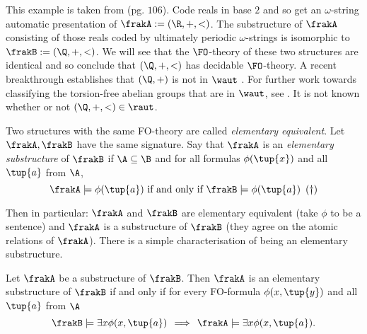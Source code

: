 \begin{example}
This example is taken from \cite{Dauc93} (pg. $106$). Code reals in base $2$ and so get an $\omega$-string automatic presentation of  $\frakA := (\R,+,<)$. The substructure of $\frakA$ consisting of those reals coded by ultimately periodic $\omega$-strings is isomorphic to $\frakB := (\Q,+,<)$. We will see that the $\FO$-theory of these two structures are  identical and so conclude that $(\Q,+,<)$ has decidable $\FO$-theory. A recent breakthrough establishes that $(\Q,+)$ is not in $\waut$ \cite{Tsan11}. For further work towards classifying the torsion-free abelian groups that are in $\waut$, see \cite{BrSr11}. It is not known whether or not $(\Q,+,<) \in \raut$. 
\end{example} 

Two structures with the same FO-theory are called {\em elementary equivalent}. Let $\frakA,\frakB$ have the same signature. 
Say that $\frakA$ is an {\em elementary substructure} of $\frakB$ if
$\A \subseteq \B$ and for all formulas $\phi(\tup{x})$ and all $\tup{a}$ from $\A$,
\[
\frakA \models \phi(\tup{a}) \mbox{ if and only if } \frakB \models \phi(\tup{a}) \hspace{5pt} (\dagger)
\]

Then in particular: $\frakA$ and $\frakB$ are elementary equivalent (take $\phi$ to be a sentence) 
and $\frakA$ is a substructure of $\frakB$ (they agree on the atomic relations of $\frakA$).
There is a simple characterisation of being an elementary substructure.

\begin{lemma}
Let $\frakA$ be a substructure of $\frakB$.
Then $\frakA$ is an elementary substructure of $\frakB$ if and only if  for every FO-formula $\phi(x,\tup{y})$ and all $\tup{a}$ from $\A$
\[
\frakB \models \exists x \phi(x,\tup{a}) \,  \implies\,  \frakA \models \exists x \phi(x,\tup{a}).
\]
\end{lemma}


